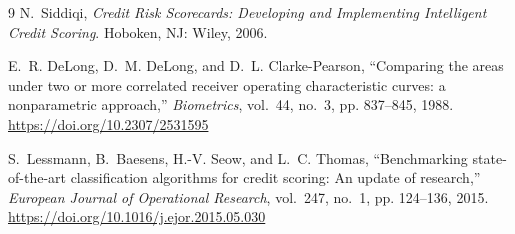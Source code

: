 \documentclass[a4paper,twocolumn,10pt]{article}
\begin{document}
\begin{thebibliography}{9}
\small
{}
N.~Siddiqi, \textit{Credit Risk Scorecards: Developing and Implementing Intelligent Credit Scoring}. Hoboken, NJ: Wiley, 2006.

E.~R. DeLong, D.~M. DeLong, and D.~L. Clarke-Pearson, ``Comparing the areas under two or more correlated receiver operating characteristic curves: a nonparametric approach,'' \textit{Biometrics}, vol.~44, no.~3, pp. 837--845, 1988. \url{https://doi.org/10.2307/2531595}

S.~Lessmann, B.~Baesens, H.-V. Seow, and L.~C. Thomas, ``Benchmarking state-of-the-art classification algorithms for credit scoring: An update of research,'' \textit{European Journal of Operational Research}, vol.~247, no.~1, pp. 124--136, 2015. \url{https://doi.org/10.1016/j.ejor.2015.05.030}
\end{thebibliography}
\end{document}
